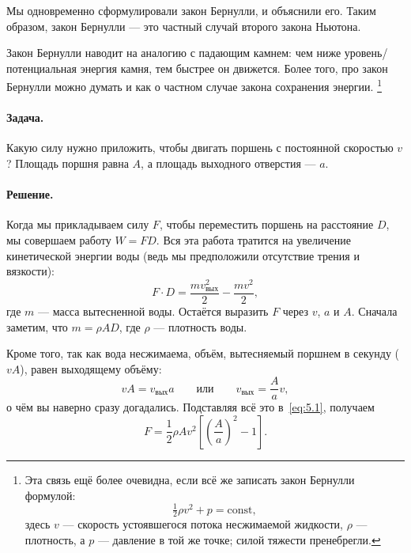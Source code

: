 Мы одновременно сформулировали закон Бернулли, и объяснили его.
Таким образом, закон Бернулли --- это частный случай второго закона Ньютона.

Закон Бернулли наводит на аналогию с падающим камнем: чем ниже уровень/потенциальная энергия камня, тем быстрее он движется.
Более того, про закон Бернулли можно думать и как о частном случае закона сохранения энергии.%
\footnote{Эта связь ещё более очевидна, если всё же записать закон Бернулли формулой: \[\tfrac12\rho v^2 + p = \text{const},\]
здесь $v$ --- скорость устоявшегося потока несжимаемой жидкости, $\rho$ --- плотность, а $p$ --- давление в той же точке; силой тяжести пренебрегли.\pr}

\paragraph{Задача.}
Какую силу нужно приложить, чтобы двигать поршень с постоянной скоростью $v$?
Площадь поршня равна $A$, а площадь выходного отверстия — $a$.

\paragraph{Решение.}
Когда мы прикладываем силу $F$, чтобы переместить поршень на расстояние $D$, мы совершаем работу $W = F D$.
Вся эта работа тратится на увеличение кинетической энергии воды (ведь мы предположили отсутствие трения и вязкости):
\begin{equation}
F \cdot D = \frac{m v_{\text{вых}}^{2}}{2} - \frac{m v^{2}}{2},
\label{eq:5.1}
\end{equation}
где $m$ — масса вытесненной воды.
Остаётся выразить $F$ через $v$, $a$ и $A$.
Сначала заметим, что $m = \rho A D$, где $\rho$ — плотность воды.

Кроме того, так как вода несжимаема, объём, вытесняемый поршнем в секунду ($vA$), равен выходящему объёму:
\[
vA = v_{\text{вых}} a
\qquad\text{или}\qquad
v_{\text{вых}} = \frac{A}{a} v,
\]
о чём вы наверно сразу догадались.
Подставляя всё это в~\eqref{eq:5.1}, получаем
\begin{equation}
F = \frac12\rho A v^{2} \left[ \left(\frac{A}{a}\right)^2  - 1 \right].
\label{eq:5.2}
\end{equation}

